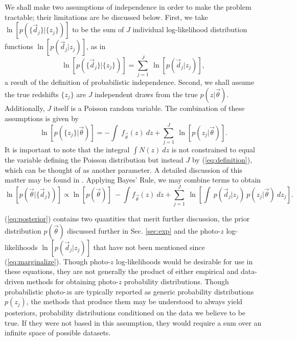 \documentclass[preprint]{aastex}
\begin{document}
We shall make two assumptions of independence in order to make the problem 
tractable; their limitations are be discussed below.  First, we take 
$\ln[p(\{\vec{d}_{j}\}|\{z_{j}\})]$ to be the sum of $J$ individual 
log-likelihood distribution functions $\ln[p(\vec{d}_{j}|z_{j})]$, as in 
\begin{equation}
\label{eq:indiedat}
\ln[p(\{\vec{d}_{j}\}|\{z_{j}\})] = \sum_{j=1}^{J}\ \ln[p(\vec{d}_{j}|z_{j})],
\end{equation}
a result of the definition of probabilistic independence.  Second, we shall 
assume the true redshifts $\{z_{j}\}$ are $J$ independent draws from the true 
$p(z|\vec{\theta})$.  Additionally, $J$ itself is a Poisson random variable.  
The combination of these assumptions is given by 
\begin{equation}
\label{eq:indie}
\ln[p(\{z_{j}\}|\vec{\theta})] = -\int\ f_{\vec{\theta}}(z)\ dz +  
\sum_{j=1}^{J}\ \ln[p(z_{j}|\vec{\theta})].
\end{equation}
It is important to note that the integral $\int N(z)\ dz$ is not constrained to 
equal the variable defining the Poisson distribution but instead $J$ by 
(\ref{eq:definition}), which can be thought of as another parameter.  A 
detailed discussion of this matter may be found in \citet{Foreman-Mackey2014}.  
Applying Bayes' Rule, we may combine terms to obtain 
\begin{equation}
\label{eq:posterior}
\ln[p(\vec{\theta}|\{\vec{d}_{j}\})] \propto \ln[p(\vec{\theta})]\ -\int 
f_{\vec{\theta}}(z)\ dz + \sum_{j=1}^{J}\ \ln\left[\int\ p(\vec{d}_{j}|z_{j})\ 
p(z_{j}|\vec{\theta})\ dz_{j}\right].
\end{equation}

(\ref{eq:posterior}) contains two quantities that merit further discussion, the 
prior distribution $p(\vec{\theta})$ discussed further in Sec. \ref{sec:exp} 
and the photo-$z$ log-likelihoods $\ln[p(\vec{d}_{j}|z_{j})]$ that have not 
been mentioned since (\ref{eq:marginalize}).  Though photo-$z$ log-likelihoods 
would be desirable for use in these equations, they are not generally the 
product of either empirical and data-driven methods for obtaining photo-$z$ 
probability distributions.  Though probabilistic photo-$z$s are typically 
reported as generic probability distributions $p(z_{j})$, the methods that 
produce them may be understood to always yield posteriors, probability 
distributions conditioned on the data we believe to be true.  If they were not 
based in this assumption, they would require a sum over an infinite space of 
possible datasets.
\end{document}
